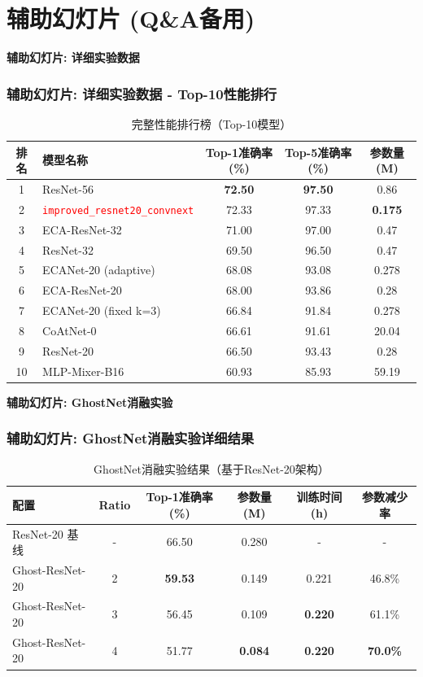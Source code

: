 \documentclass[10pt]{beamer}
\begin{document}
\section{辅助幻灯片 (Q\&A备用)}
\begin{frame}{\textbf{辅助幻灯片: 详细实验数据}}
\frametitle{辅助幻灯片: 详细实验数据 - Top-10性能排行}

\begin{table}[h]
\centering
\small
\begin{tabular}{|c|l|c|c|c|}
\hline
排名 & 模型名称 & Top-1准确率(\%) & Top-5准确率(\%) & 参数量(M) \\
\hline
1 & ResNet-56 & \textbf{72.50} & \textbf{97.50} & 0.86 \\
2 & \textcolor{red}{\texttt{improved\_resnet20\_convnext}} & 72.33 & 97.33 & \textbf{0.175} \\
3 & ECA-ResNet-32 & 71.00 & 97.00 & 0.47 \\
4 & ResNet-32 & 69.50 & 96.50 & 0.47 \\
5 & ECANet-20 (adaptive) & 68.08 & 93.08 & 0.278 \\
6 & ECA-ResNet-20 & 68.00 & 93.86 & 0.28 \\
7 & ECANet-20 (fixed k=3) & 66.84 & 91.84 & 0.278 \\
8 & CoAtNet-0 & 66.61 & 91.61 & 20.04 \\
9 & ResNet-20 & 66.50 & 93.43 & 0.28 \\
10 & MLP-Mixer-B16 & 60.93 & 85.93 & 59.19 \\
\hline
\end{tabular}
\caption{完整性能排行榜（Top-10模型）}
\end{table}

\end{frame}

\begin{frame}{\textbf{辅助幻灯片: GhostNet消融实验}}
\frametitle{辅助幻灯片: GhostNet消融实验详细结果}

\begin{table}[h]
\centering
\small
\begin{tabular}{|l|c|c|c|c|c|}
\hline
配置 & Ratio & Top-1准确率(\%) & 参数量(M) & 训练时间(h) & 参数减少率 \\
\hline
ResNet-20 基线 & - & 66.50 & 0.280 & - & - \\
Ghost-ResNet-20 & 2 & \textbf{59.53} & 0.149 & 0.221 & 46.8\% \\
Ghost-ResNet-20 & 3 & 56.45 & 0.109 & \textbf{0.220} & 61.1\% \\
Ghost-ResNet-20 & 4 & 51.77 & \textbf{0.084} & \textbf{0.220} & \textbf{70.0\%} \\
\hline
\end{tabular}
\caption{GhostNet消融实验结果（基于ResNet-20架构）}
\end{table}

\end{frame}
\end{document}
